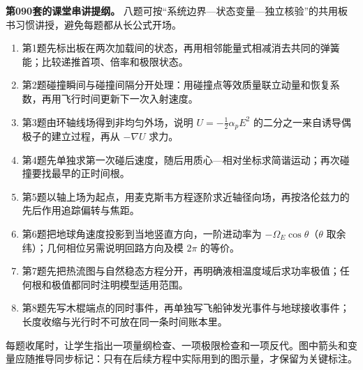 \documentclass[12pt,a4paper,UTF8]{ctexart}
\newcommand{\tightlist}{\setlength{\itemsep}{0pt}\setlength{\parskip}{0pt}}
\begin{document}
\textbf{第090套的课堂串讲提纲。}
八题可按``系统边界---状态变量---独立核验''的共用板书习惯讲授，避免每题都从长公式开场。

\begin{enumerate}
\def\labelenumi{\arabic{enumi}.}
\tightlist
\item
  第1题先标出板在两次加载间的状态，再用相邻能量式相减消去共同的弹簧能；比较递推首项、倍率和极限状态。
\item
  第2题碰撞瞬间与碰撞间隔分开处理：用碰撞点等效质量联立动量和恢复系数，再用飞行时间更新下一次入射速度。
\item
  第3题由环轴线场得到非均匀外场，说明 \(U=-\tfrac12\alpha_pE^2\)
  的二分之一来自诱导偶极子的建立过程，再从 \(-\nabla U\) 求力。
\item
  第4题先单独求第一次碰后速度，随后用质心---相对坐标求简谐运动；再次碰撞要找最早的正时间根。
\item
  第5题以轴上场为起点，用麦克斯韦方程逐阶求近轴径向场，再按洛伦兹力的先后作用追踪偏转与焦距。
\item
  第6题把地球角速度投影到当地竖直方向，一阶进动率为
  \(-\Omega_E\cos\theta\)（\(\theta\)
  取余纬）；几何相位另需说明回路方向及模 \(2\pi\) 的等价。
\item
  第7题先把热流图与自然稳态方程分开，再明确液相温度域后求功率极值；任何根和极值都同时注明模型适用范围。
\item
  第8题先写木棍端点的同时事件，再单独写飞船钟发光事件与地球接收事件；长度收缩与光行时不可放在同一条时间账本里。
\end{enumerate}

每题收尾时，让学生指出一项量纲检查、一项极限检查和一项反代。图中箭头和变量应随推导同步标记：只有在后续方程中实际用到的图示量，才保留为关键标注。
\end{document}
